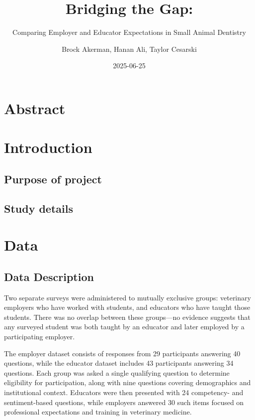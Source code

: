 \documentclass[
  11pt,
  letterpaper,
  DIV=11,
  numbers=noendperiod]{scrartcl}
\title{Bridging the Gap:}
\subtitle{Comparing Employer and Educator Expectations in Small Animal
Dentistry}
\author{Brock Akerman, Hanan Ali, Taylor Cesarski}
\date{2025-06-25}
\renewcommand*\contentsname{Table of contents}
\newcommand\contentsname{Table of contents}
\begin{document}
\maketitle

\renewcommand*\contentsname{Table of contents}
{
\hypersetup{linkcolor=}
\setcounter{tocdepth}{2}
\tableofcontents
}

\section{Abstract}\label{abstract}

\section{Introduction}\label{introduction}

\subsection{Purpose of project}\label{purpose-of-project}

\subsection{Study details}\label{study-details}

\section{Data}\label{data}

\subsection{Data Description}\label{data-description}

Two separate surveys were administered to mutually exclusive groups:
veterinary employers who have worked with students, and educators who
have taught those students. There was no overlap between these
groups---no evidence suggests that any surveyed student was both taught
by an educator and later employed by a participating employer.

The employer dataset consists of responses from 29 participants
answering 40 questions, while the educator dataset includes 43
participants answering 34 questions. Each group was asked a single
qualifying question to determine eligibility for participation, along
with nine questions covering demographics and institutional context.
Educators were then presented with 24 competency- and sentiment-based
questions, while employers answered 30 such items focused on
professional expectations and training in veterinary medicine.
\end{document}
